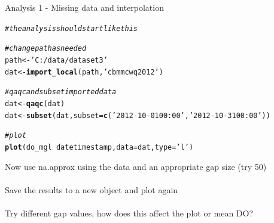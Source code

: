 \documentclass[xcolor=svgnames]{beamer}\usepackage[]{graphicx}\usepackage[]{color}
\makeatletter
\newcommand{\hlstr}[1]{\textcolor[rgb]{0.192,0.494,0.8}{#1}}%
\newcommand{\hlcom}[1]{\textcolor[rgb]{0.678,0.584,0.686}{\textit{#1}}}%
\newcommand{\hlopt}[1]{\textcolor[rgb]{0,0,0}{#1}}%
\newcommand{\hlstd}[1]{\textcolor[rgb]{0.345,0.345,0.345}{#1}}%
\newcommand{\hlkwb}[1]{\textcolor[rgb]{0.69,0.353,0.396}{#1}}%
\newcommand{\hlkwc}[1]{\textcolor[rgb]{0.333,0.667,0.333}{#1}}%
\newcommand{\hlkwd}[1]{\textcolor[rgb]{0.737,0.353,0.396}{\textbf{#1}}}%
\newenvironment{kframe}{%
 \def\at@end@of@kframe{}%
 \ifinner\ifhmode%
  \def\at@end@of@kframe{\end{minipage}}%
  \begin{minipage}{\columnwidth}%
 \fi\fi%
 \def\FrameCommand##1{\hskip\@totalleftmargin \hskip-\fboxsep
 \colorbox{shadecolor}{##1}\hskip-\fboxsep
     \hskip-\linewidth \hskip-\@totalleftmargin \hskip\columnwidth}%
 \MakeFramed {\advance\hsize-\width
   \@totalleftmargin\z@ \linewidth\hsize
   \@setminipage}}%
 {\par\unskip\endMakeFramed%
 \at@end@of@kframe}
\newenvironment{knitrout}{}{} %
\makeatother
\begin{document}
\begin{frame}[containsverbatim]{Analysis 1 - Missing data and interpolation}
\begin{knitrout}\scriptsize
{}\color{fgcolor}\begin{kframe}
\begin{alltt}
\hlcom{# the analysis should start like this}

\hlcom{# change path as needed}
\hlstd{path} \hlkwb{<-} \hlstr{'C:/data/dataset3'}
\hlstd{dat} \hlkwb{<-} \hlkwd{import_local}\hlstd{(path,} \hlstr{'cbmmcwq2012'}\hlstd{)}

\hlcom{# qaqc and subset imported data}
\hlstd{dat} \hlkwb{<-} \hlkwd{qaqc}\hlstd{(dat)}
\hlstd{dat} \hlkwb{<-} \hlkwd{subset}\hlstd{(dat,} \hlkwc{subset} \hlstd{=} \hlkwd{c}\hlstd{(}\hlstr{'2012-10-01 00:00'}\hlstd{,} \hlstr{'2012-10-31 00:00'}\hlstd{))}

\hlcom{# plot}
\hlkwd{plot}\hlstd{(do_mgl} \hlopt{~} \hlstd{datetimestamp,} \hlkwc{data} \hlstd{= dat,} \hlkwc{type} \hlstd{=} \hlstr{'l'}\hlstd{)}
\end{alltt}
\end{kframe}
\end{knitrout}
Now use na.approx using the data and an appropriate gap size (try 50) \\~\\
Save the results to a new object and plot again \\~\\
Try different gap values, how does this affect the plot or mean DO?
\end{frame}
\end{document}
